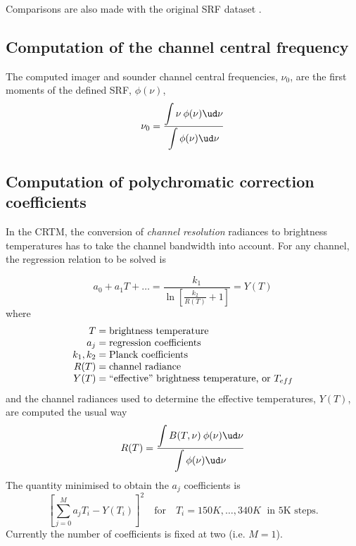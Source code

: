 Comparisons are also made with the original SRF dataset \citep{INSAT3D_SRF_Data}.


\subsection{Computation of the channel central frequency}
The computed imager and sounder channel central frequencies, $\nu_0$, are the first moments of the defined SRF, $\phi(\nu)$,
\begin{equation}
  \nu_0 = \frac{\displaystyle\int{\nu\:\phi(\nu)\ud \nu}}{\displaystyle\int{\phi(\nu)\ud \nu}}
\end{equation}


\subsection{Computation of polychromatic correction coefficients}
In the CRTM, the conversion of \emph{channel resolution} radiances to brightness temperatures has to take the channel bandwidth into account. For any channel, the regression relation to be solved is

\begin{equation}
  a_0 + a_1T + \ldots = \frac{\displaystyle k_1}{\displaystyle \ln\left[\frac{k_2}{R(T)}+1\right]} = Y(T)
  \label{eqn:polycorr_regression}
\end{equation}
where
\begin{equation*}
  \begin{array}{r@{\;=\;}l}
         T &\mbox{brightness temperature} \\
        a_j&\mbox{regression coefficients} \\
    k_1,k_2&\mbox{Planck coefficients} \\
       R(T)&\mbox{channel radiance} \\
       Y(T)&\mbox{``effective'' brightness temperature, or $T_{eff}$}
  \end{array}
\end{equation*}
and the channel radiances used to determine the effective temperatures, $Y(T)$, are computed the usual way
\begin{equation}
  R(T) = \frac{\displaystyle\int{B(T,\nu)\:\phi(\nu)\ud \nu}}{\displaystyle\int{\phi(\nu)\ud \nu}}
\end{equation}
The quantity minimised to obtain the $a_j$ coefficients is
\begin{equation}
  \left[ \sum_{j=0}^{M}a_j T_{i} - Y(T_{i}) \right]^2 \quad\mbox{for}\quad T_i = 150K, \ldots, 340K \;\mbox{ in 5K steps.}
\end{equation}
Currently the number of coefficients is fixed at two (i.e. $M=1$).



